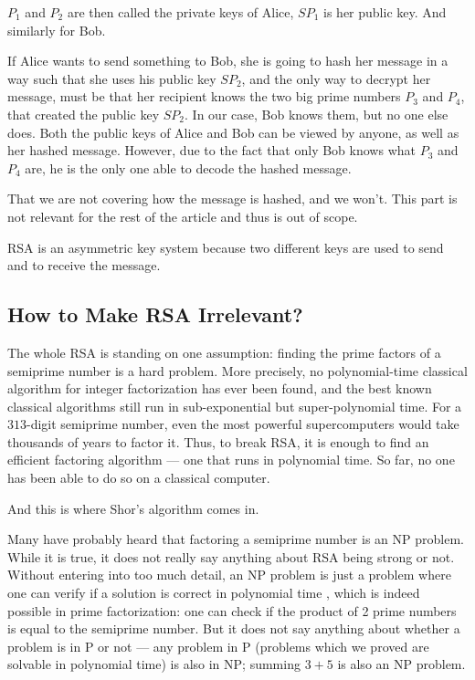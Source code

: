 $P_1$ and $P_2$ are then called the private keys of Alice, $SP_1$ is her
public key. And similarly for Bob.

If Alice wants to send something to Bob, she is going to hash her message in
a way such that she uses his public key $SP_2$, and the only way to decrypt
her message, must be that her recipient knows the two big prime numbers $P_3$
and $P_4$, that created the public key $SP_2$. In our case, Bob knows them,
but no one else does. Both the public keys of Alice and Bob can be viewed by
anyone, as well as her hashed message. However, due to the fact that only Bob
knows what $P_3$ and $P_4$ are, he is the only one able to decode the hashed
message.

\begin{smjnote}
That we are not covering how the message is hashed, and we won't. This part
is not relevant for the rest of the article and thus is out of scope.
\end{smjnote}

\begin{smjnote}
RSA is an asymmetric key system because two different keys are used to send
and to receive the message.
\end{smjnote}

\subsection{How to Make RSA Irrelevant?}

The whole RSA is standing on one assumption: finding the prime factors of a
semiprime number is a hard problem. More precisely, no polynomial-time
classical algorithm for integer factorization has ever been found, and the
best known classical algorithms still run in sub-exponential but
super-polynomial time. For a $313$-digit semiprime number, even the most
powerful supercomputers would take thousands of years to factor it. Thus, to
break RSA, it is enough to find an efficient factoring algorithm --- one that
runs in polynomial time. So far, no one has been able to do so on a classical
computer.

And this is where Shor's algorithm comes in.

\begin{smjnote}
Many have probably heard that factoring a semiprime number is an NP problem.
While it is true, it does not really say anything about RSA being strong or
not. Without entering into too much detail, an NP problem is just a problem
where one can verify if a solution is correct in polynomial time \cite{arora2009},
which is indeed possible in prime factorization: one can check if the product
of 2 prime numbers is equal to the semiprime number. But it does not say
anything about whether a problem is in P or not --- any problem in P (problems
which we proved are solvable in polynomial time) is also in NP; summing
$3 + 5$ is also an NP problem.
\end{smjnote}

